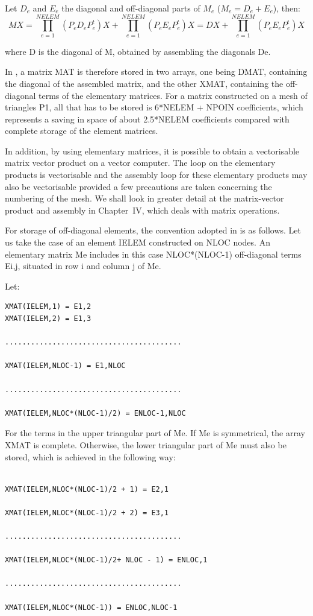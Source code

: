 Let $D_{e}$ and $E_{e}$ the diagonal and off-diagonal parts of $M_{e}$ ($M_{e}
= D_{e} + E_{e}$), then:
\[MX=\prod _{e=1}^{NELEM}(P_{e} D_{e} P_{e}^{t} )X+\prod _{e=1}^{NELEM}(P_{e}
E_{e} P_{e}^{t} )X  =DX+\prod _{e=1}^{NELEM}(P_{e} E_{e} P_{e}^{t} )X \]

where D is the diagonal of M, obtained by assembling the diagonals De.

In \bief, a matrix MAT is therefore stored in two arrays, one being DMAT,
containing the diagonal of the assembled matrix, and the other XMAT, containing
the off-diagonal terms of the elementary matrices. For a matrix constructed on
a mesh of triangles P1, all that has to be stored is 6*NELEM + NPOIN
coefficients, which represents a saving in space of about 2.5*NELEM
coefficients compared with complete storage of the element matrices.

In addition, by using elementary matrices, it is possible to obtain a
vectorisable matrix vector product on a vector computer. The loop on the
elementary products is vectorisable and the assembly loop for these elementary
products may also be vectorisable provided a few precautions are taken
concerning the numbering of the mesh. We shall look in greater detail at the
matrix-vector product and assembly in Chapter~IV, which deals with matrix
operations.

For storage of off-diagonal elements, the convention adopted in \bief is as
follows. Let us take the case of an element IELEM constructed on NLOC nodes. An
elementary matrix Me includes in this case NLOC*(NLOC-1) off-diagonal terms
Ei,j, situated in row i and column j of Me.

Let:
\begin{lstlisting}[language=TelFortran]
XMAT(IELEM,1) = E1,2
XMAT(IELEM,2) = E1,3

.........................................

XMAT(IELEM,NLOC-1) = E1,NLOC

.........................................

XMAT(IELEM,NLOC*(NLOC-1)/2) = ENLOC-1,NLOC
\end{lstlisting}

For the terms in the upper triangular part of Me. If Me is symmetrical, the
array XMAT is complete. Otherwise, the lower triangular part of Me must also be
stored, which is achieved in the following way:
\begin{lstlisting}[language=TelFortran]

XMAT(IELEM,NLOC*(NLOC-1)/2 + 1) = E2,1

XMAT(IELEM,NLOC*(NLOC-1)/2 + 2) = E3,1

.........................................

XMAT(IELEM,NLOC*(NLOC-1)/2+ NLOC - 1) = ENLOC,1

.........................................

XMAT(IELEM,NLOC*(NLOC-1)) = ENLOC,NLOC-1
\end{lstlisting}

